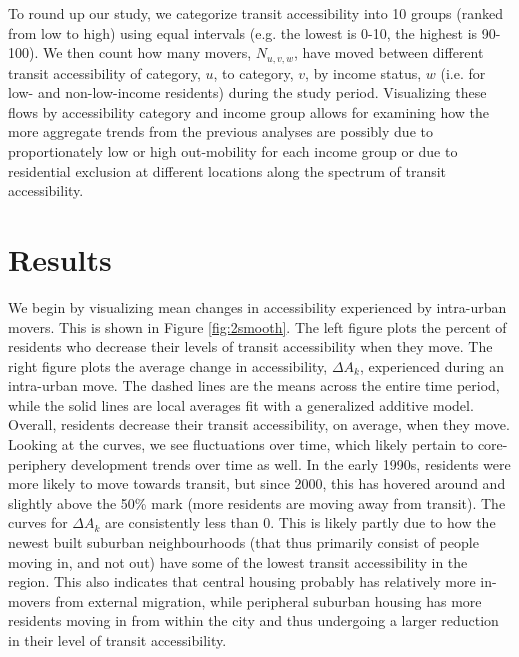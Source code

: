 



To round up our study, we categorize transit accessibility into 10 groups (ranked from low to high) using equal intervals (e.g. the lowest is 0-10, the highest is 90-100). We then count how many movers, $N_{u,v,w}$, have moved between different transit accessibility of category, $u$, to category, $v$, by income status, $w$ (i.e. for low- and non-low-income residents) during the study period. Visualizing these flows by accessibility category and income group allows for examining how the more aggregate trends from the previous analyses are possibly due to proportionately low or high out-mobility for each income group or due to residential exclusion at different locations along the spectrum of transit accessibility.




\section{Results}

We begin by visualizing mean changes in accessibility experienced by intra-urban movers. This is shown in Figure \ref{fig:2smooth}. The left figure plots the percent of residents who decrease their levels of transit accessibility when they move. The right figure plots the average change in accessibility, $\Delta A_{k}$, experienced during an intra-urban move. The dashed lines are the means across the entire time period, while the solid lines are local averages fit with a generalized additive model. Overall, residents decrease their transit accessibility, on average, when they move. Looking at the curves, we see fluctuations over time, which likely pertain to core-periphery development trends over time as well. In the early 1990s, residents were more likely to move towards transit, but since 2000, this has hovered around and slightly above the 50\% mark (more residents are moving away from transit). The curves for $\Delta A_{k}$ are consistently less than 0. This is likely partly due to how the newest built suburban neighbourhoods (that thus primarily consist of people moving in, and not out) have some of the lowest transit accessibility in the region. This also indicates that central housing probably has relatively more in-movers from external migration, while peripheral suburban housing has more residents moving in from within the city and thus undergoing a larger reduction in their level of transit accessibility.


